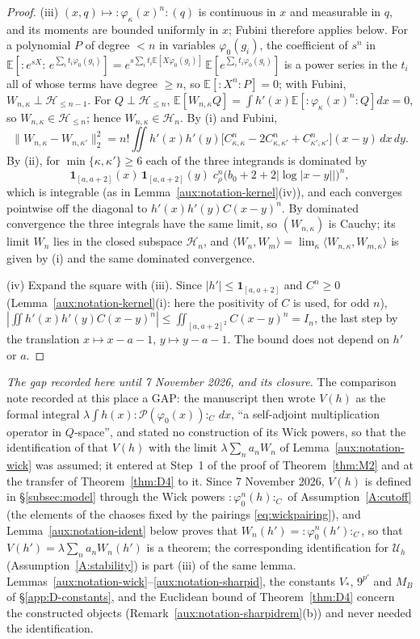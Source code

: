 \documentclass[11pt,a4paper]{article}
\theoremstyle{plain}
\theoremstyle{definition}
\theoremstyle{plain}
\theoremstyle{definition}
\newcommand{\E}{\mathbb{E}}
\newcommand{\ip}[2]{\langle #1,#2\rangle}
\begin{document}
\begin{proof}
(iii) $(x,q)\mapsto{:}\varphi_\kappa(x)^n{:}(q)$ is continuous in $x$ and measurable in $q$,
and its moments are bounded uniformly in $x$; Fubini therefore applies below.  For a
polynomial $P$ of degree $<n$ in variables $\varphi_0(g_i)$, the coefficient of $s^n$ in
$\E[{:}e^{sX}{:}\,e^{\sum_it_i\varphi_0(g_i)}]=e^{s\sum_it_i\E[X\varphi_0(g_i)]}\,
\E[e^{\sum_it_i\varphi_0(g_i)}]$ is a power series in the $t_i$ all of whose terms have
degree $\ge n$, so $\E[{:}X^n{:}P]=0$; with Fubini, $W_{n,\kappa}\perp\mathcal H_{\le n-1}$.
For $Q\perp\mathcal H_{\le n}$, $\E[W_{n,\kappa}Q]=\int h'(x)\E[{:}\varphi_\kappa(x)^n{:}Q]dx=0$,
so $W_{n,\kappa}\in\mathcal H_{\le n}$; hence $W_{n,\kappa}\in\mathcal H_n$.  By (i) and
Fubini,
\[
 \|W_{n,\kappa}-W_{n,\kappa'}\|_2^2=n!\iint h'(x)h'(y)\bigl[C_{\kappa,\kappa}^n-2C_{\kappa,\kappa'}^n
 +C_{\kappa',\kappa'}^n\bigr](x-y)\,dx\,dy .
\]
By (ii), for $\min\{\kappa,\kappa'\}\ge6$ each of the three integrands is dominated by
\[
 \mathbf 1_{[a,a+2]}(x)\,\mathbf 1_{[a,a+2]}(y)\;c_\rho^n\bigl(b_0+2+2|\log|x-y||\bigr)^n ,
\]
which is integrable (as in Lemma~\ref{aux:notation-kernel}(iv)), and each converges pointwise off the
diagonal to $h'(x)h'(y)C(x-y)^n$.  By dominated convergence the three integrals have the same
limit, so $(W_{n,\kappa})$ is Cauchy; its limit $W_n$ lies in the closed subspace $\mathcal
H_n$, and $\ip{W_n}{W_m}=\lim_\kappa\ip{W_{n,\kappa}}{W_{m,\kappa}}$ is given by (i) and the
same dominated convergence.

(iv) Expand the square with (iii).  Since $|h'|\le\mathbf 1_{[a,a+2]}$ and $C^n\ge0$
(Lemma~\ref{aux:notation-kernel}(i): here the positivity of $C$ is used, for odd $n$),
$|\iint h'(x)h'(y)C(x-y)^n|\le\iint_{[a,a+2]^2}C(x-y)^n=I_n$, the last step by the
translation $x\mapsto x-a-1$, $y\mapsto y-a-1$.  The bound does not depend on $h'$ or $a$.
\end{proof}

\emph{The gap recorded here until 7 November 2026, and its closure.}  The comparison note
recorded at this place a GAP: the manuscript then wrote $V(h)$ as the formal integral
$\lambda\int h(x){:}\mathscr P(\varphi_0(x)){:}_C\,dx$, ``a self-adjoint multiplication
operator in $Q$-space'', and stated no construction of its Wick powers, so that the
identification of that $V(h)$ with the limit $\lambda\sum_na_nW_n$ of
Lemma~\ref{aux:notation-wick} was assumed; it entered at Step~1 of the proof of
Theorem~\ref{thm:M2} and at the transfer of Theorem~\ref{thm:D4} to it.  Since 7 November
2026, $V(h)$ is defined in \S\ref{subsec:model} through the Wick powers
${:}\varphi_0^n(h){:}_C$ of Assumption~\ref{A:cutoff} (the elements of the chaoses fixed by the
pairings \eqref{eq:wickpairing}), and Lemma~\ref{aux:notation-ident} below proves that
$W_n(h')={:}\varphi_0^n(h'){:}_C$, so that $V(h')=\lambda\sum_na_nW_n(h')$ is a theorem; the
corresponding identification for $\mathcal U_h$ (Assumption~\ref{A:stability}) is part (iii)
of the same lemma.  Lemmas~\ref{aux:notation-wick}--\ref{aux:notation-sharpid}, the constants
$V_*$, $9^{p'}$ and $M_B$ of \S\ref{app:D-constants}, and the Euclidean bound of
Theorem~\ref{thm:D4} concern the constructed objects (Remark~\ref{aux:notation-sharpidrem}(b))
and never needed the identification.
\end{document}
